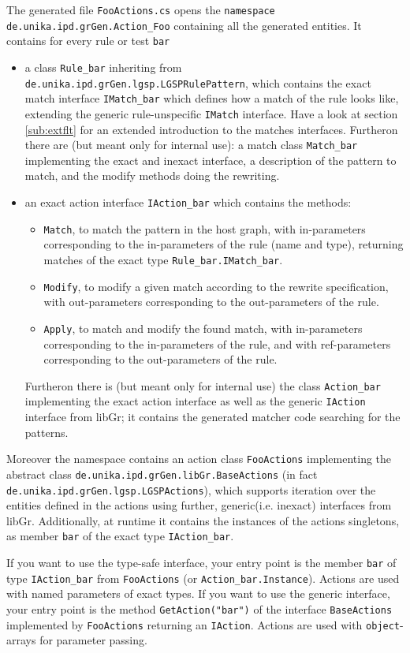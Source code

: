 The generated file \texttt{FooActions.cs} opens the \texttt{namespace de.unika.ipd.grGen.Action\_Foo} containing all the generated entities.
It contains for every rule or test \texttt{bar}
\begin{itemize}
\item a class \texttt{Rule\_bar} inheriting from \texttt{de.unika.ipd.grGen.lgsp.LGSPRulePattern}, which contains
the exact match interface \texttt{IMatch\_bar} which defines how a match of the rule looks like,
extending the generic rule-unspecific \texttt{IMatch} interface.
Have a look at section \ref{sub:extflt} for an extended introduction to the matches interfaces. 
Furtheron there are (but meant only for internal use): a match class \texttt{Match\_bar} implementing the exact and inexact interface,
a description of the pattern to match, and the modify methods doing the rewriting.
\item an exact action interface \texttt{IAction\_bar} which contains the methods:
  \begin{itemize}
  \item \texttt{Match}, to match the pattern in the host graph,
     with in-parameters corresponding to the in-parameters of the rule (name and type),
	 returning matches of the exact type \texttt{Rule\_bar.IMatch\_bar}.
  \item \texttt{Modify}, to modify a given match according to the rewrite specification,
     with out-parameters corresponding to the out-parameters of the rule.
  \item \texttt{Apply}, to match and modify the found match,
     with in-parameters corresponding to the in-parameters of the rule,
     and with ref-parameters corresponding to the out-parameters of the rule.
  \end{itemize}
  Furtheron there is (but meant only for internal use) the class \texttt{Action\_bar} implementing the exact action interface as well as the generic \texttt{IAction} interface from libGr;
  it contains the generated matcher code searching for the patterns.
\end{itemize}

Moreover the namespace contains an action class \texttt{FooActions}
implementing the abstract class \texttt{de.unika.ipd.grGen.libGr.BaseActions} (in fact \texttt{de.unika.ipd.grGen.lgsp.LGSPActions}),
which supports iteration over the entities defined in the actions using further, generic(i.e. inexact) interfaces from libGr.
Additionally, at runtime it contains the instances of the actions singletons,
as member \texttt{bar} of the exact type \texttt{IAction\_bar}.
\begin{note}
If you want to use the type-safe interface, your entry point is the member \texttt{bar} of type \texttt{IAction\_bar} from \texttt{FooActions} (or \texttt{Action\_bar.Instance}).
Actions are used with named parameters of exact types.
If you want to use the generic interface, your entry point is the method \texttt{GetAction("bar")} of the interface \texttt{BaseActions} implemented by \texttt{FooActions} returning an \texttt{IAction}.
Actions are used with \texttt{object}-arrays for parameter passing.
\end{note}

